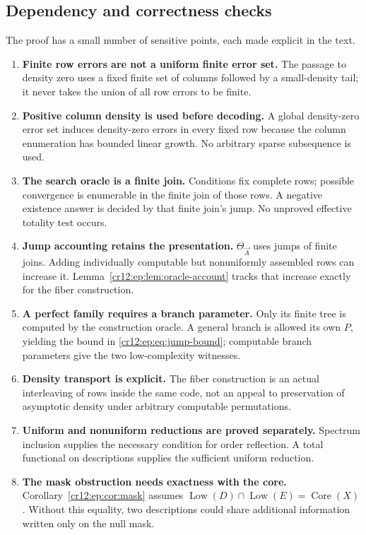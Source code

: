 \documentclass[11pt,letterpaper]{article}
\theoremstyle{plain}
\theoremstyle{definition}
\theoremstyle{remark}
\numberwithin{equation}{section}
\newcommand{\Core}{\operatorname{Core}}
\newcommand{\Low}{\operatorname{Low}}
\begin{document}
\subsection{Dependency and correctness checks}
The proof has a small number of sensitive points, each made explicit in the text.
\begin{enumerate}[label=\textup{(\arabic*)}]
\item \textbf{Finite row errors are not a uniform finite error set.} The passage to
density zero uses a fixed finite set of columns followed by a small-density tail; it
never takes the union of all row errors to be finite.
\item \textbf{Positive column density is used before decoding.} A global density-zero
error set induces density-zero errors in every fixed row because the column
enumeration has bounded linear growth. No arbitrary sparse subsequence is used.
\item \textbf{The search oracle is a finite join.} Conditions fix complete rows;
possible convergence is enumerable in the finite join of those rows. A negative
existence answer is decided by that finite join's jump. No unproved effective
totality test occurs.
\item \textbf{Jump accounting retains the presentation.} $\Theta_{\vec A}$ uses jumps of
finite joins. Adding individually computable but nonuniformly assembled rows can
increase it. Lemma~\ref{cr12:ep:lem:oracle-account} tracks that increase exactly for
the fiber construction.
\item \textbf{A perfect family requires a branch parameter.} Only its finite tree is
computed by the construction oracle. A general branch is allowed its own $P$,
yielding the bound in \eqref{cr12:ep:eq:jump-bound}; computable branch parameters
give the two low-complexity witnesses.
\item \textbf{Density transport is explicit.} The fiber construction is an actual
interleaving of rows inside the same code, not an appeal to preservation of
asymptotic density under arbitrary computable permutations.
\item \textbf{Uniform and nonuniform reductions are proved separately.} Spectrum
inclusion supplies the necessary condition for order reflection. A total functional
on descriptions supplies the sufficient uniform reduction.
\item \textbf{The mask obstruction needs exactness with the core.}
Corollary~\ref{cr12:ep:cor:mask} assumes $\Low(D)\cap\Low(E)=\Core(X)$. Without this
equality, two descriptions could share additional information written only on the
null mask.
\end{enumerate}
\end{document}
